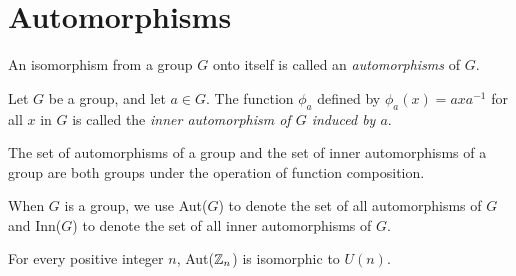\section{Automorphisms}

\begin{definition}[Automorphism]
	An isomorphism from a group $G$ onto itself is called an \textit{automorphisms} of $G$.
\end{definition}

\begin{definition}
	Let $G$ be a group, and let $a \in G$. The function $\phi_a$ defined by $\phi_a(x) = axa^{-1}$ for all $x$ in $G$ is called the \textit{inner automorphism of $G$ induced by $a$}.
\end{definition}

\begin{theorem}
	The set of automorphisms of a group and the set of inner automorphisms of a group are both groups under the operation of function composition.

	When $G$ is a group, we use Aut($G$) to denote the set of all automorphisms of $G$ and Inn($G$) to denote the set of all inner automorphisms of $G$.
\end{theorem}

\begin{theorem}
	For every positive integer $n$, Aut($\mathbb{Z}_n$) is isomorphic to $U(n)$.
\end{theorem}
